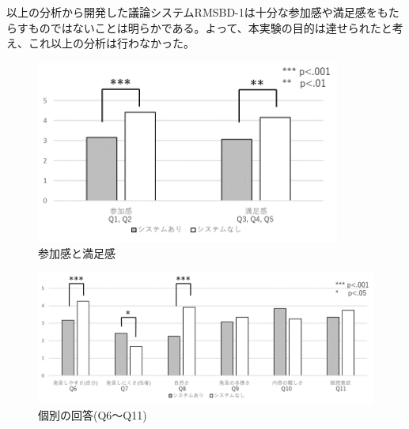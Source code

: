 \documentclass[11pt, a4paper]{jreport} %
\begin{document}
以上の分析から開発した議論システムRMSBD-1は十分な参加感や満足感をもたらすものではないことは明らかである。よって、本実験の目的は達せられたと考え、これ以上の分析は行わなかった。%

\begin{figure}[htbp]
\begin{center}
\includegraphics[width=100mm]{images/jikken1_manzoku.png}
\caption{参加感と満足感}
\label{fig:jikken1_sat}
\end{center}
\end{figure}

\begin{figure}[htbp]
\begin{center}
\includegraphics[width=150mm]{images/jikken1_kobetu}
\caption{個別の回答(Q6～Q11)}
\label{fig:jikken1_kobetu}
\end{center}
\end{figure}
\end{document}
